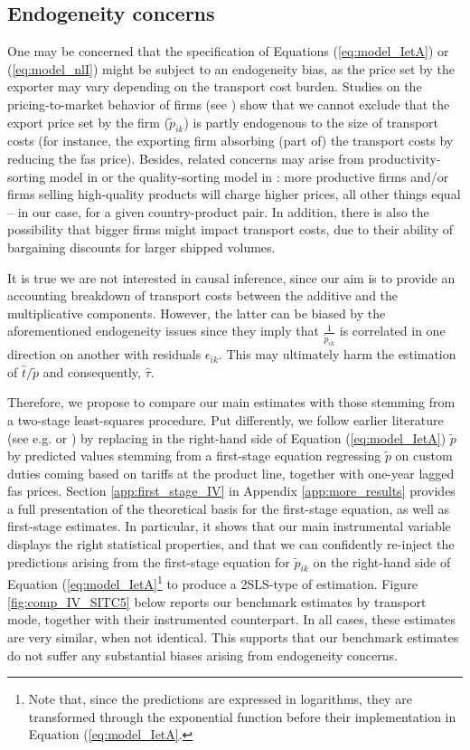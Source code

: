 \documentclass[a4paper,11pt]{article}
\begin{document}
\subsection{Endogeneity concerns} One may be concerned that the specification of Equations (\ref{eq:model_IetA}) or (\ref{eq:model_nlI}) might be subject to an endogeneity bias, as the price set by the exporter may vary depending on the transport cost burden. Studies on the pricing-to-market behavior of firms (see \citealp{Krugman-87}) show that we cannot exclude that the export price set by the firm ($\widetilde{p}_{ik}$) is partly endogenous to the size of transport costs (for instance, the exporting firm absorbing (part of) the transport costs by reducing the fas price).
Besides, related concerns may arise from productivity-sorting model in \cite{melitz} or the quality-sorting model in \cite{baldwin_harrigan}: more productive firms and/or firms selling high-quality products will charge higher prices, all other things equal – in our case, for a given country-product pair. In addition, there is also the possibility that bigger firms might impact transport costs, due to their ability of bargaining discounts for larger shipped volumes.

It is true we are not interested in causal inference, since our aim is to provide an accounting breakdown of transport costs between the additive and the multiplicative components. However, the latter can be biased by the aforementioned endogeneity issues since they imply that $\frac{1}{\widetilde{p}_{ik}}$ is correlated in one direction on another with residuals $\epsilon_{ik}$. This may ultimately harm the estimation of $\widehat{t}/\widetilde{p}$ and consequently, $\widehat{\tau}$.

Therefore, we propose to compare our main estimates with those stemming from a two-stage least-squares procedure. Put differently, we follow earlier literature (see e.g. \citealp{Caliendo_Parro_2015} or \citealp{Lashkaripour-2017}) by replacing in the right-hand side of Equation (\ref{eq:model_IetA}) $\widetilde{p}$ by predicted values stemming from a first-stage equation regressing $\widetilde{p}$ on custom duties coming based on tariffs at the product line, together with one-year lagged fas prices. Section \ref{app:first_stage_IV} in Appendix \ref{app:more_results} provides a full presentation of the theoretical basis for the first-stage equation, as well as first-stage estimates. In particular, it shows that our main instrumental variable displays the right statistical properties, and that we can confidently re-inject the predictions arising from the first-stage equation for $\widetilde{p}_{ik}$ on the right-hand side of Equation (\ref{eq:model_IetA}\footnote{Note that, since the predictions are expressed in logarithms, they are transformed through the exponential function before their implementation in Equation (\ref{eq:model_IetA}.} to produce a 2SLS-type of estimation. Figure \ref{fig:comp_IV_SITC5} below reports our benchmark estimates by transport mode, together with their instrumented counterpart. In all cases, these estimates are very similar, when not identical. This supports that our benchmark estimates do not suffer any substantial biases arising from endogeneity concerns.
\end{document}
